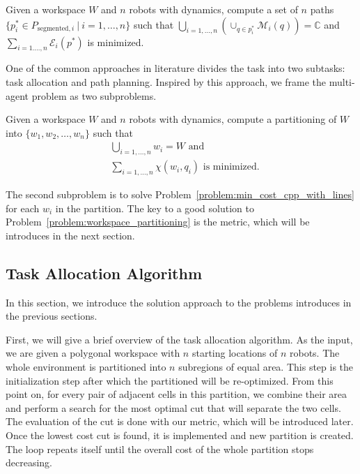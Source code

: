 \documentclass[../main.tex]{subfiles}
\begin{document}
\begin{problem}
\label{problem:min_cost_distr_cpp_with_lines}
	Given a workspace $W$ and $n$ robots with dynamics, compute a set of $n$ paths $\{p^*_i\in P_{\text{segmented},i}\ |\ i=1,\dots,n\}$ such that $\bigcup_{i=1,\dots,n}(\cup_{q\in p^*_i}\mathcal{M}_i(q))=\mathbb{C}$ and $\sum_{i=1.\dots,n}\mathcal{E}_i(p^*)$ is minimized.
\end{problem}

One of the common approaches in literature divides the task into two subtasks: task allocation and path planning. Inspired by this approach, we frame the multi-agent problem as two subproblems.

\begin{problem}
\label{problem:workspace_partitioning}
	Given a workspace $W$ and $n$ robots with dynamics, compute a partitioning of $W$ into $\{w_1,w_2,\dots,w_n\}$ such that
	\begin{equation}
	\begin{aligned}
		& \bigcup_{i=1,\dots,n}w_i=W\text{ and}\\
		& \sum_{i=1,\dots,n}\chi(w_i,q_i)\text{ is minimized}.
	\end{aligned}
	\end{equation}
\end{problem}

The second subproblem is to solve Problem~\ref{problem:min_cost_cpp_with_lines} for each $w_i$ in the partition. The key to a good solution to Problem~\ref{problem:workspace_partitioning} is the metric, which will be introduces in the next section.


\subsection{Task Allocation Algorithm}
\label{sec:task_allocation_algo}
In this section, we introduce the solution approach to the problems introduces in the previous sections.

First, we will give a brief overview of the task allocation algorithm. As the input, we are given a polygonal workspace with $n$ starting locations of $n$ robots. The whole environment is partitioned into $n$ subregions of equal area. This step is the initialization step after which the partitioned will be re-optimized. From this point on, for every pair of adjacent cells in this partition, we combine their area and perform a search for the most optimal cut that will separate the two cells. The evaluation of the cut is done with our metric, which will be introduced later. Once the lowest cost cut is found, it is implemented and new partition is created. The loop repeats itself until the overall cost of the whole partition stops decreasing. 
\end{document}
